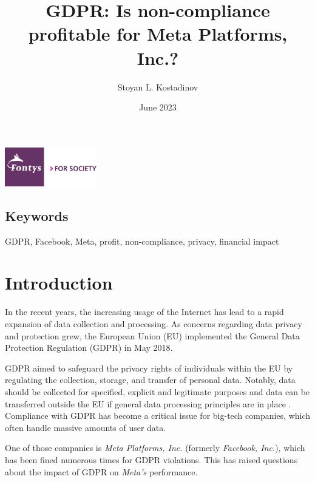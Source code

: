 \documentclass[12pt, a4paper]{article}
\title{GDPR: Is non-compliance profitable for Meta Platforms, Inc.?}
\author{Stoyan L. Kostadinov}
\date{June 2023}
\begin{document}
\maketitle

\begin{center}
    \includegraphics[width=0.3\textwidth]{fontys-logo}
\end{center}

\begin{abstract}
\end{abstract}

\subsection*{Keywords}

GDPR, Facebook, Meta, profit, non-compliance, privacy, financial impact

\section*{Introduction}

In the recent years, the increasing usage of the Internet has lead to a rapid
expansion of data collection and processing\cite{khan2014big}. As concerns
regarding data privacy and protection grew, the European Union (EU) implemented
the General Data Protection Regulation (GDPR) in May
2018\cite{greengard2018weighing, historyGdpr}.

GDPR aimed to safeguard the privacy rights of individuals within the EU by
regulating the collection, storage, and transfer of personal
data\cite{historyGdpr}. Notably, data should be collected for specified,
explicit and legitimate purposes\cite{europeanParliamentGdprArticle5} and data
can be transferred outside the EU if general data processing principles are in
place \cite{europeanParliamentGdprArticle44}. Compliance with GDPR has become a
critical issue for big-tech companies, which often handle massive amounts of
user data.

One of those companies is \textit{Meta Platforms, Inc.} (formerly
\textit{Facebook, Inc.}), which has been fined numerous times for GDPR
violations\cite{mrevzar2023analysis}. This has raised questions about the impact
of GDPR on \textit{Meta's} performance.
\end{document}
